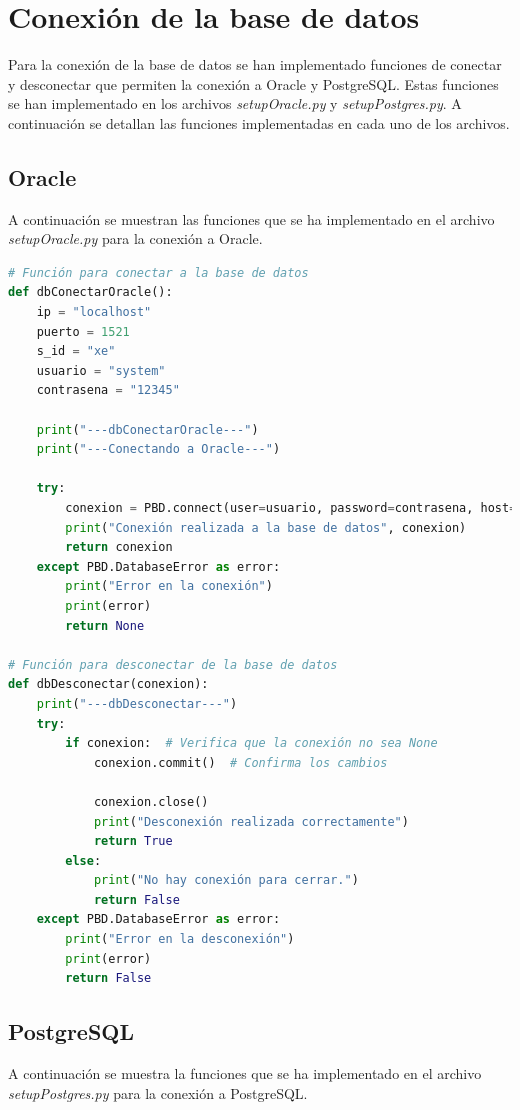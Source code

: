 \documentclass[a4paper,12pt]{article}
\begin{document}
\section{Conexión de la base de datos}
Para la conexión de la base de datos se han implementado funciones de conectar y desconectar que permiten la conexión a Oracle y PostgreSQL.
Estas funciones se han implementado en los archivos \textit{setupOracle.py} y \textit{setupPostgres.py}.
A continuación se detallan las funciones implementadas en cada uno de los archivos.

\subsection{Oracle}
A continuación se muestran las funciones que se ha implementado en el archivo \textit{setupOracle.py} para la conexión a Oracle.

\begin{lstlisting}[language=Python]
# Función para conectar a la base de datos
def dbConectarOracle():
    ip = "localhost"
    puerto = 1521
    s_id = "xe"
    usuario = "system"
    contrasena = "12345"

    print("---dbConectarOracle---")
    print("---Conectando a Oracle---")

    try:
        conexion = PBD.connect(user=usuario, password=contrasena, host=ip, port=puerto, sid=s_id)
        print("Conexión realizada a la base de datos", conexion)
        return conexion
    except PBD.DatabaseError as error:
        print("Error en la conexión")
        print(error)
        return None

# Función para desconectar de la base de datos
def dbDesconectar(conexion):
    print("---dbDesconectar---")
    try:
        if conexion:  # Verifica que la conexión no sea None
            conexion.commit()  # Confirma los cambios

            conexion.close()
            print("Desconexión realizada correctamente")
            return True
        else:
            print("No hay conexión para cerrar.")
            return False
    except PBD.DatabaseError as error:
        print("Error en la desconexión")
        print(error)
        return False
\end{lstlisting}

\subsection{PostgreSQL}
A continuación se muestra la funciones que se ha implementado en el archivo \textit{setupPostgres.py} para la conexión a PostgreSQL.
\end{document}
